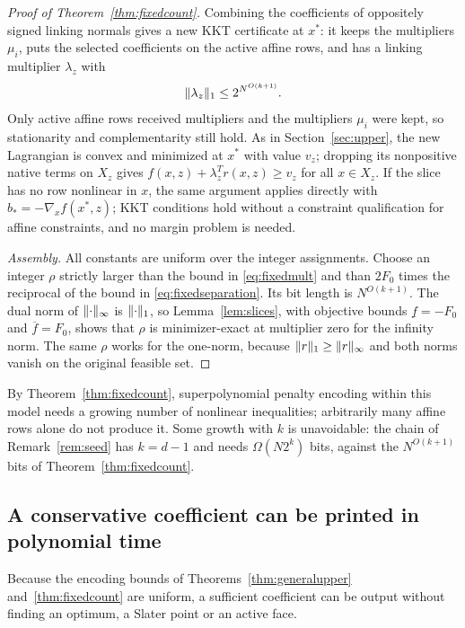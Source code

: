 \begin{proof}[Proof of Theorem~\ref{thm:fixedcount}]
Combining the coefficients of oppositely signed linking normals gives a
new KKT certificate at $x^*$: it keeps the multipliers $\mu_i$, puts the
selected coefficients on the active affine rows, and has a linking
multiplier $\lambda_z$ with
\begin{equation}\label{eq:fixedmult}
 \lVert\lambda_z\rVert_1\le2^{N^{O(k+1)}}.
\end{equation}
Only active affine rows received multipliers and the multipliers $\mu_i$
were kept, so stationarity and complementarity still hold. As in
Section~\ref{sec:upper}, the new Lagrangian is convex and minimized at
$x^*$ with value $v_z$; dropping its nonpositive native terms on $X_z$
gives $f(x,z)+\lambda_z^Tr(x,z)\ge v_z$ for all $x\in X_z$. If the slice
has no row nonlinear in $x$, the same argument applies directly with
$b_*=-\nabla_xf(x^*,z)$; KKT conditions hold without a constraint
qualification for affine constraints, and no margin problem is needed.

\emph{Assembly.}
All constants are uniform over the integer assignments. Choose an integer
$\rho$ strictly larger than the bound in \eqref{eq:fixedmult} and than
$2F_0$ times the reciprocal of the bound in \eqref{eq:fixedseparation}.
Its bit length is $N^{O(k+1)}$. The dual norm of $\lVert\cdot\rVert_\infty$ is
$\lVert\cdot\rVert_1$, so Lemma~\ref{lem:slices}, with objective bounds
$\underline f=-F_0$ and $\overline f=F_0$, shows that $\rho$ is
minimizer-exact at multiplier zero for the infinity norm. The same $\rho$
works for the one-norm, because $\lVert r\rVert_1\ge\lVert r\rVert_\infty$ and both
norms vanish on the original feasible set.
\end{proof}

\begin{remark}
By Theorem~\ref{thm:fixedcount}, superpolynomial penalty encoding within
this model needs a growing number of nonlinear inequalities; arbitrarily
many affine rows alone do not produce it. Some growth with $k$ is
unavoidable: the chain of Remark~\ref{rem:seed} has $k=d-1$ and needs
$\Omega(N2^k)$ bits, against the $N^{O(k+1)}$ bits of
Theorem~\ref{thm:fixedcount}.
\end{remark}

\subsection{A conservative coefficient can be printed in polynomial time}
Because the encoding bounds of Theorems~\ref{thm:generalupper}
and~\ref{thm:fixedcount} are uniform, a sufficient coefficient can be
output without finding an optimum, a Slater point or an active face.

